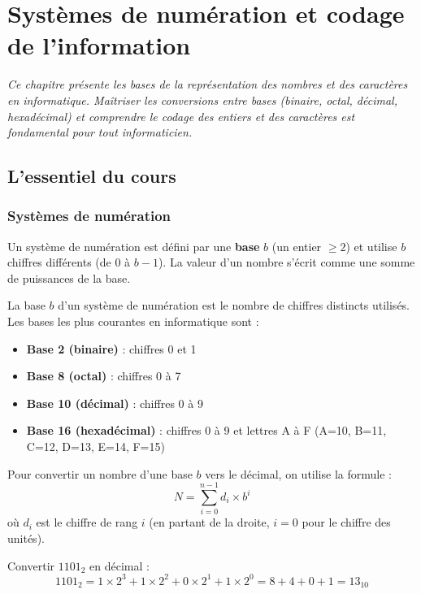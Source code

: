 \chapter{Systèmes de numération et codage de l'information}

\textit{Ce chapitre présente les bases de la représentation des nombres et des caractères en informatique. Maîtriser les conversions entre bases (binaire, octal, décimal, hexadécimal) et comprendre le codage des entiers et des caractères est fondamental pour tout informaticien.}

\section{L'essentiel du cours}

\subsection{Systèmes de numération}

Un système de numération est défini par une \textbf{base} $b$ (un entier $\geq 2$) et utilise $b$ chiffres différents (de 0 à $b-1$). La valeur d'un nombre s'écrit comme une somme de puissances de la base.

\begin{definition}
La base $b$ d'un système de numération est le nombre de chiffres distincts utilisés. Les bases les plus courantes en informatique sont :
\begin{itemize}
    \item \textbf{Base 2 (binaire)} : chiffres 0 et 1
    \item \textbf{Base 8 (octal)} : chiffres 0 à 7
    \item \textbf{Base 10 (décimal)} : chiffres 0 à 9
    \item \textbf{Base 16 (hexadécimal)} : chiffres 0 à 9 et lettres A à F (A=10, B=11, C=12, D=13, E=14, F=15)
\end{itemize}
\end{definition}

\begin{aretenir}
Pour convertir un nombre d'une base $b$ vers le décimal, on utilise la formule :
\[
N = \sum_{i=0}^{n-1} d_i \times b^i
\]
où $d_i$ est le chiffre de rang $i$ (en partant de la droite, $i=0$ pour le chiffre des unités).
\end{aretenir}

\begin{exemple}
Convertir $1101_2$ en décimal :
\[
1101_2 = 1\times2^3 + 1\times2^2 + 0\times2^1 + 1\times2^0 = 8 + 4 + 0 + 1 = 13_{10}
\]
\end{exemple}


